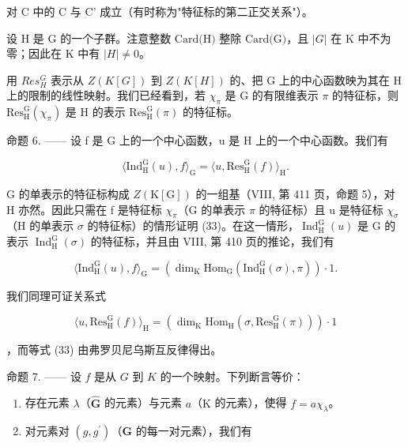 对 C 中的 C 与 C' 成立（有时称为"特征标的第二正交关系"）。

设 H 是 G 的一个子群。注意整数 \(\text{Card(H)}\) 整除 \(\text{Card(G)}\)，且 \(|G|\) 在 K 中不为零；因此在 K 中有 \(|H| \neq 0\)。

用 \(Res_{H}^{G}\) 表示从 \(Z(K[G])\) 到 \(Z(K[H])\) 的、把 G 上的中心函数映为其在 H 上的限制的线性映射。我们已经看到，若 \(\chi_{\pi}\) 是 G 的有限维表示 \(\pi\) 的特征标，则 \(\mathrm{Res}_{\mathrm{H}}^{\mathrm{G}}(\chi_{\pi})\) 是 H 的表示 \(\mathrm{Res}_{\mathrm{H}}^{\mathrm{G}}(\pi)\) 的特征标。

命题 6. —— 设 f 是 G 上的一个中心函数，u 是 H 上的一个中心函数。我们有

\[
\langle \mathrm{Ind} _ {\mathrm{H}} ^ {\mathrm{G}} (u), f \rangle_ {\mathrm{G}} = \langle u, \mathrm{Res} _ {\mathrm{H}} ^ {\mathrm{G}} (f) \rangle_ {\mathrm{H}}.\tag{33}
\]

G 的单表示的特征标构成 \(Z(\mathrm{K}[\mathrm{G}])\) 的一组基（VIII, 第 411 页，命题 5），对 H 亦然。因此只需在 f 是特征标 \(\chi_{\pi}\)（G 的单表示 \(\pi\) 的特征标）且 u 是特征标 \(\chi_{\sigma}\)（H 的单表示 \(\sigma\) 的特征标）的情形证明 (33)。在这一情形，\(\operatorname{Ind}_{\mathrm{H}}^{\mathrm{G}}(u)\) 是 G 的表示 \(\operatorname{Ind}_{\mathrm{H}}^{\mathrm{G}}(\sigma)\) 的特征标，并且由 VIII, 第 410 页的推论，我们有

\[
\langle \mathrm{Ind} _ {\mathrm{H}} ^ {\mathrm{G}} (u), f \rangle_ {\mathrm{G}} = (\dim_ {\mathrm{K}} \mathrm{Hom} _ {\mathrm{G}} (\mathrm{Ind} _ {\mathrm{H}} ^ {\mathrm{G}} (\sigma), \pi)) \cdot 1.
\]

我们同理可证关系式

\[
\langle u, \mathrm{Res} _ {\mathrm{H}} ^ {\mathrm{G}} (f) \rangle_ {\mathrm{H}} = (\dim_ {\mathrm{K}} \mathrm{Hom} _ {\mathrm{H}} (\sigma , \mathrm{Res} _ {\mathrm{H}} ^ {\mathrm{G}} (\pi))) \cdot 1
\]

，而等式 (33) 由弗罗贝尼乌斯互反律得出。

命题 7. —— 设 \(f\) 是从 \(G\) 到 \(K\) 的一个映射。下列断言等价：

\begin{enumerate}
\def\labelenumi{(\roman{enumi})}
\item
  存在元素 \(\lambda\)（\(\widehat{\mathbf{G}}\) 的元素）与元素 \(a\)（\(\mathrm{K}\) 的元素），使得 \(f = a\chi_{\lambda}\)。
\item
  对元素对 \((g,g^{\prime})\)（\(\mathbf{G}\) 的每一对元素），我们有
\end{enumerate}

